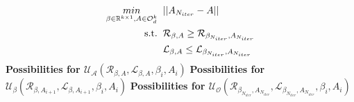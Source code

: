 \begin{equation}
\begin{aligned}
    \underset{\beta \in \mathbb{R}^{k \times 1}, A \in \mathcal{O}_d^k}{min}& \hspace{2mm} ||A_{N_{iter}}-A||\\
    \text{s.t.}& \hspace{2mm} \mathcal{R}_{\beta, A} \ge \mathcal{R}_{\beta_{N_{iter}}, A_{N_{iter}}}\\
    & \hspace{2mm} \mathcal{L}_{\beta, A} \le \mathcal{L}_{\beta_{N_{iter}}, A_{N_{iter}}}
\end{aligned}
\end{equation}
\newline \textbf{Possibilities for $\mathcal{U_{A}}(\mathcal{R}_{\beta, A},\mathcal{L}_{\beta, A},\beta_i,A_i)$}
\hspace{2mm} \newline \textbf{Possibilities for $\mathcal{U_{\beta}}(\mathcal{R}_{\beta, A_{i+1}},\mathcal{L}_{\beta, A_{i+1}},\beta_i,A_i)$}
\hspace{2mm} \newline \textbf{Possibilities for $\mathcal{U_{O}}(\mathcal{R}_{\beta_{N_{iter}}, A_{N_{iter}}},\mathcal{L}_{\beta_{N_{iter}}, A_{N_{iter}}},\beta_i,A_i)$}

